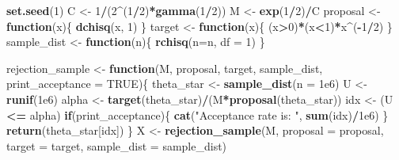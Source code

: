 \documentclass[
]{article}
\newenvironment{Shaded}{\begin{snugshade}}{\end{snugshade}}
\newcommand{\AttributeTok}[1]{\textcolor[rgb]{0.13,0.29,0.53}{#1}}
\newcommand{\ConstantTok}[1]{\textcolor[rgb]{0.56,0.35,0.01}{#1}}
\newcommand{\ControlFlowTok}[1]{\textcolor[rgb]{0.13,0.29,0.53}{\textbf{#1}}}
\newcommand{\DecValTok}[1]{\textcolor[rgb]{0.00,0.00,0.81}{#1}}
\newcommand{\FloatTok}[1]{\textcolor[rgb]{0.00,0.00,0.81}{#1}}
\newcommand{\FunctionTok}[1]{\textcolor[rgb]{0.13,0.29,0.53}{\textbf{#1}}}
\newcommand{\NormalTok}[1]{#1}
\newcommand{\OtherTok}[1]{\textcolor[rgb]{0.56,0.35,0.01}{#1}}
\newcommand{\SpecialCharTok}[1]{\textcolor[rgb]{0.81,0.36,0.00}{\textbf{#1}}}
\newcommand{\StringTok}[1]{\textcolor[rgb]{0.31,0.60,0.02}{#1}}
\begin{document}
\begin{Shaded}
\begin{Highlighting}[]
\FunctionTok{set.seed}\NormalTok{(}\DecValTok{1}\NormalTok{)}
\NormalTok{C }\OtherTok{\textless{}{-}} \DecValTok{1}\SpecialCharTok{/}\NormalTok{(}\DecValTok{2}\SpecialCharTok{\^{}}\NormalTok{(}\DecValTok{1}\SpecialCharTok{/}\DecValTok{2}\NormalTok{)}\SpecialCharTok{*}\FunctionTok{gamma}\NormalTok{(}\DecValTok{1}\SpecialCharTok{/}\DecValTok{2}\NormalTok{))}
\NormalTok{M }\OtherTok{\textless{}{-}} \FunctionTok{exp}\NormalTok{(}\DecValTok{1}\SpecialCharTok{/}\DecValTok{2}\NormalTok{)}\SpecialCharTok{/}\NormalTok{C}
\NormalTok{proposal }\OtherTok{\textless{}{-}} \ControlFlowTok{function}\NormalTok{(x)\{}
  \FunctionTok{dchisq}\NormalTok{(x, }\DecValTok{1}\NormalTok{)}
\NormalTok{\}}
\NormalTok{target }\OtherTok{\textless{}{-}} \ControlFlowTok{function}\NormalTok{(x)\{}
\NormalTok{  (x}\SpecialCharTok{\textgreater{}}\DecValTok{0}\NormalTok{)}\SpecialCharTok{*}\NormalTok{(x}\SpecialCharTok{\textless{}}\DecValTok{1}\NormalTok{)}\SpecialCharTok{*}\NormalTok{x}\SpecialCharTok{\^{}}\NormalTok{(}\SpecialCharTok{{-}}\DecValTok{1}\SpecialCharTok{/}\DecValTok{2}\NormalTok{)}
\NormalTok{\}}
\NormalTok{sample\_dist }\OtherTok{\textless{}{-}} \ControlFlowTok{function}\NormalTok{(n)\{}
  \FunctionTok{rchisq}\NormalTok{(}\AttributeTok{n=}\NormalTok{n, }\AttributeTok{df =} \DecValTok{1}\NormalTok{)}
\NormalTok{\}}

\NormalTok{rejection\_sample }\OtherTok{\textless{}{-}} \ControlFlowTok{function}\NormalTok{(M, proposal, target, sample\_dist, }\AttributeTok{print\_acceptance =} \ConstantTok{TRUE}\NormalTok{)\{}
\NormalTok{  theta\_star }\OtherTok{\textless{}{-}} \FunctionTok{sample\_dist}\NormalTok{(}\AttributeTok{n =} \FloatTok{1e6}\NormalTok{)}
\NormalTok{  U }\OtherTok{\textless{}{-}} \FunctionTok{runif}\NormalTok{(}\FloatTok{1e6}\NormalTok{)}
\NormalTok{  alpha }\OtherTok{\textless{}{-}} \FunctionTok{target}\NormalTok{(theta\_star)}\SpecialCharTok{/}\NormalTok{(M}\SpecialCharTok{*}\FunctionTok{proposal}\NormalTok{(theta\_star))}
\NormalTok{  idx }\OtherTok{\textless{}{-}}\NormalTok{ (U }\SpecialCharTok{\textless{}=}\NormalTok{ alpha)}
  \ControlFlowTok{if}\NormalTok{(print\_acceptance)\{}
    \FunctionTok{cat}\NormalTok{(}\StringTok{"Acceptance rate is: "}\NormalTok{, }\FunctionTok{sum}\NormalTok{(idx)}\SpecialCharTok{/}\FloatTok{1e6}\NormalTok{)}
\NormalTok{  \}}
  \FunctionTok{return}\NormalTok{(theta\_star[idx])}
\NormalTok{\}}
\NormalTok{X }\OtherTok{\textless{}{-}} \FunctionTok{rejection\_sample}\NormalTok{(M, }\AttributeTok{proposal =}\NormalTok{ proposal, }\AttributeTok{target =}\NormalTok{ target, }\AttributeTok{sample\_dist =}\NormalTok{ sample\_dist)}
\end{Highlighting}
\end{Shaded}
\end{document}
